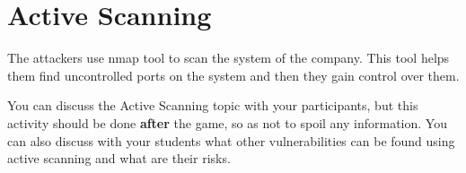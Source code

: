 \section{Active Scanning}

The attackers use nmap tool to scan the system of the company. This tool helps them find uncontrolled ports on the system and then they gain control over them. 

\begin{hint}
    You can discuss the Active Scanning topic with your participants, but this activity should be done \textbf{after} the game, so as not to spoil any information.
   You can also discuss with your students what other vulnerabilities can be found using active scanning and what are their risks.
\end{hint}
